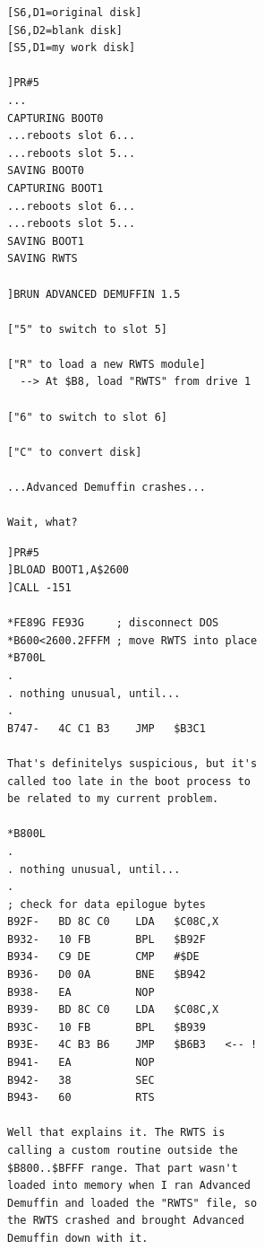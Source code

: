 \documentclass{article}
\begin{document}
\begin{verbatim}
[S6,D1=original disk]
[S6,D2=blank disk]
[S5,D1=my work disk]

]PR#5
...
CAPTURING BOOT0
...reboots slot 6...
...reboots slot 5...
SAVING BOOT0
CAPTURING BOOT1
...reboots slot 6...
...reboots slot 5...
SAVING BOOT1
SAVING RWTS

]BRUN ADVANCED DEMUFFIN 1.5

["5" to switch to slot 5]

["R" to load a new RWTS module]
  --> At $B8, load "RWTS" from drive 1

["6" to switch to slot 6]

["C" to convert disk]

...Advanced Demuffin crashes...

Wait, what?
\end{verbatim}

\newpage

\begin{verbatim}
]PR#5
]BLOAD BOOT1,A$2600
]CALL -151

*FE89G FE93G     ; disconnect DOS
*B600<2600.2FFFM ; move RWTS into place
*B700L
.
. nothing unusual, until...
.
B747-   4C C1 B3    JMP   $B3C1

That's definitelys suspicious, but it's
called too late in the boot process to
be related to my current problem.

*B800L
.
. nothing unusual, until...
.
; check for data epilogue bytes
B92F-   BD 8C C0    LDA   $C08C,X
B932-   10 FB       BPL   $B92F
B934-   C9 DE       CMP   #$DE
B936-   D0 0A       BNE   $B942
B938-   EA          NOP
B939-   BD 8C C0    LDA   $C08C,X
B93C-   10 FB       BPL   $B939
B93E-   4C B3 B6    JMP   $B6B3   <-- !
B941-   EA          NOP
B942-   38          SEC
B943-   60          RTS

Well that explains it. The RWTS is
calling a custom routine outside the
$B800..$BFFF range. That part wasn't
loaded into memory when I ran Advanced
Demuffin and loaded the "RWTS" file, so
the RWTS crashed and brought Advanced
Demuffin down with it.
\end{verbatim}

\newpage
\end{document}
